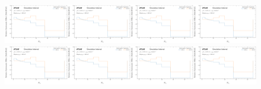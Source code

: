 \begin{figure}[h!]
\centering
\includegraphics[width=0.25\textwidth,page=1]{figures/SimResults/MultiFold_QCD_SystEffect.pdf}\includegraphics[width=0.25\textwidth,page=2]{figures/SimResults/MultiFold_QCD_SystEffect.pdf}\includegraphics[width=0.25\textwidth,page=3]{figures/SimResults/MultiFold_QCD_SystEffect.pdf}\includegraphics[width=0.25\textwidth,page=4]{figures/SimResults/MultiFold_QCD_SystEffect.pdf}\\
\includegraphics[width=0.25\textwidth,page=5]{figures/SimResults/MultiFold_QCD_SystEffect.pdf}\includegraphics[width=0.25\textwidth,page=7]{figures/SimResults/MultiFold_QCD_SystEffect.pdf}\includegraphics[width=0.25\textwidth,page=7]{figures/SimResults/MultiFold_QCD_SystEffect.pdf}\includegraphics[width=0.25\textwidth,page=8]{figures/SimResults/MultiFold_QCD_SystEffect.pdf}\\

\end{figure}
